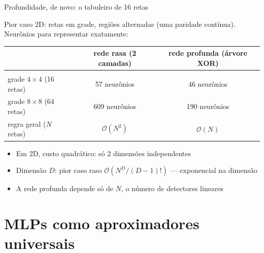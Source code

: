 \documentclass[aspectratio=169, 11pt]{beamer}
\begin{document}
\begin{frame}{Profundidade, de novo: o tabuleiro de 16 retas}

  Pior caso 2D: retas em grade, regiões alternadas (uma paridade contínua).
  Neurônios para representar exatamente:

  \medskip
  \begin{center}
    \small
    \begin{tabular}{lcc}
      & \textbf{rede rasa (2 camadas)} & \textbf{rede profunda (árvore XOR)}\\[2pt]
      \hline\\[-8pt]
      grade $4\times 4$ (16 retas)   & 57 neurônios  & 46 neurônios\\
      grade $8\times 8$ (64 retas)   & 609 neurônios & 190 neurônios\\
      regra geral ($N$ retas)        & $\mathcal{O}(N^2)$ & $\mathcal{O}(N)$\\
    \end{tabular}
  \end{center}

  \medskip
  \begin{itemize}\setlength{\itemsep}{0.25ex}
    \item Em 2D, custo quadrático: só 2 dimensões independentes
    \item Dimensão $D$: pior caso raso
          $\mathcal{O}\!\left(N^D/(D-1)!\right)$ — exponencial na dimensão
    \item A rede profunda depende só de $N$, o número de detectores lineares
  \end{itemize}
\end{frame}

\section{MLPs como aproximadores universais}
\end{document}
